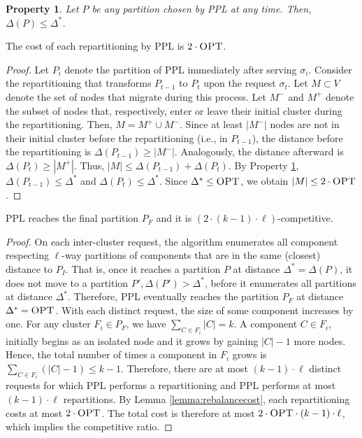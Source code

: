 \documentclass[a4paper,anonymous,USenglish]{lipics-v2019}
\newcommand{\OPT}{\textsc{OPT}\xspace}
\newcommand{\PPL}{\textsc{PPL}\xspace}
\newtheorem{property}{Property}
\begin{document}
\begin{property} \label{prop:dist<OPT}
	Let $P$ be any partition chosen by \PPL at any time.
	Then, $\Delta(P) \leq \Delta^*$.	
\end{property}

\begin{lemma}	\label{lemma:rebalancecost}
	The cost of each repartitioning by \PPL is $2\cdot\OPT$.
\end{lemma}
\begin{proof}
	Let $P_i$ denote the partition of \PPL immediately after serving $\sigma_{i}$.
	Consider the repartitioning that transforms 
	$P_{t-1}$ to $P_t$ upon the request $\sigma_t$.
	Let $M \subset V$ denote the set of nodes that migrate during this process.
	Let $M^-$ and $M^+$ denote the subset of nodes that, respectively,
	enter or leave their initial cluster during the repartitioning.    
	Then,
	$M = M^+ \cup M^-$.
	Since at least $|M^-|$ nodes are not in their initial cluster before the repartitioning (i.e., in $P_{t-1}$),
	the distance before the repartitioning is $\Delta(P_{t-1}) \geq | M^-|$.
	Analogously,
	the distance afterward is $\Delta(P_{t}) \geq | M^+|$.
	Thus,
	$|M| \leq \Delta(P_{t-1}) + \Delta(P_{t})$.
	By Property \ref{prop:dist<OPT},
	$\Delta(P_{t-1})  \leq \Delta^*$ and
	$\Delta(P_{t}) \leq \Delta^*$.
	Since $\Delta^* \leq \OPT$,
	we obtain	 $|M| \leq 2\cdot\OPT$.
\end{proof}

\begin{theorem}	\label{thm:upperbound}
	\PPL reaches the final partition $P_F$
	 and it is $(2\cdot (k-1)\cdot\ell)$-competitive.
\end{theorem}
\begin{proof}
	On each inter-cluster request,
	the algorithm enumerates all component respecting $\ell$-way partitions of components
	that are in the same (closest) distance to $P_I$.
	That is, 
	once it reaches a partition $P$ at distance $\Delta^* = \Delta(P)$,
	it does not move to a partition
	$P', \Delta(P') > \Delta^*$,
	before it enumerates all partitions at distance $\Delta^*$.
	Therefore,
	\PPL eventually reaches  the partition $P_F$ at distance $\Delta^*=\OPT$.
	With each distinct request, 
	the size of some component increases by one.
	For any cluster $F_i \in P_F$,
	we have $\sum_{C \in F_i} |C| = k$.
	A component $C \in F_i$,
	 initially begins as an isolated node and it grows by gaining $|C|-1$ more nodes.
	Hence, the total number of times a component in $F_i$ grows is 
	$\sum_{C \in F_i} (|C|-1) \leq k-1$.
	Therefore, there are at most  $(k-1)\cdot\ell $ distinct requests
	for which \PPL performs a repartitioning and
	 \PPL performs at most $(k-1)\cdot\ell $ repartitions.
	By Lemma \ref{lemma:rebalancecost},
	each repartitioning costs at most $2\cdot\OPT$.
	The total cost is therefore at most $2\cdot\OPT\cdot (k-1) \cdot\ell$, which implies the competitive ratio.
\end{proof}
\end{document}
